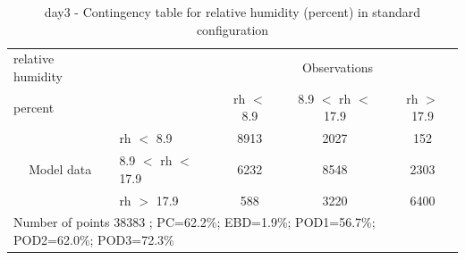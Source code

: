 \begin{table}[p!]
\begin{center}
\begin{tabular}{llccc}
\hline
{relative humidity}                                       &                                                    & \multicolumn{3}{c}{Observations}                 \\
{percent}                                       &                             & rh $<$ 8.9   & 8.9 $<$ rh $<$ 17.9 & rh $>$ 17.9 \\
\hline
\multicolumn{1}{c}{\multirow{3}{*}{Model data}}  & rh $<$ 8.9             & 8913                & 2027                       & 152              \\
                                                 & 8.9  $<$ rh $<$ 17.9 & 6232                & 8548                       & 2303              \\
                                                 & rh $>$ 17.9             & 588                & 3220                       & 6400              \\
\hline
\multicolumn{5}{l}{ Number of points        38383 ; PC=62.2\%; EBD=1.9\%; POD1=56.7\%; POD2=62.0\%; POD3=72.3\%}
\end{tabular}
\end{center}
\caption{day3 - Contingency table for  relative humidity (percent) in standard configuration}
\label{tab:contingencyrhBEF:day3}
\end{table}
